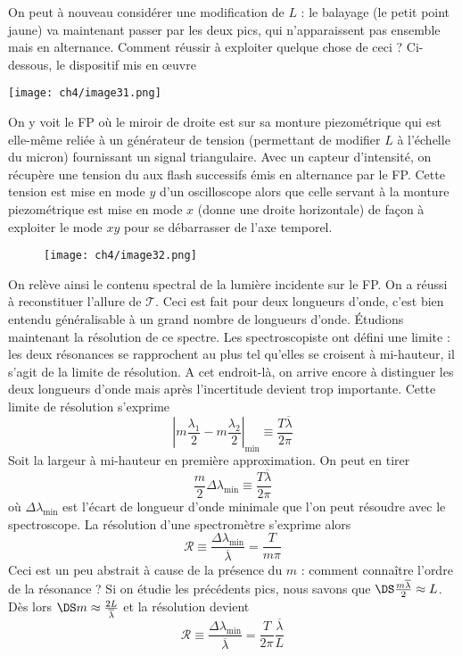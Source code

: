 On peut à nouveau considérer une modification de $L$ : le balayage (le petit point jaune) va maintenant 
passer par les deux pics, qui n'apparaissent pas ensemble mais en alternance. Comment réussir à exploiter 
quelque chose de ceci ? Ci-dessous, le dispositif mis en œuvre
\newpage
\begin{center}
	\texttt{[image: ch4/image31.png]}
\end{center}
On y voit le FP où le miroir de droite est sur sa monture piezométrique qui est elle-même reliée à 
un générateur de tension (permettant de modifier $L$ à l'échelle du micron) fournissant un signal 
triangulaire. Avec un capteur d'intensité, on récupère une tension du aux flash successifs émis en 
alternance par le FP. Cette tension est mise en mode $y$ d'un oscilloscope alors que celle servant 
à la monture piezométrique est mise en mode $x$ (donne une droite horizontale) de façon à exploiter 
le mode $xy$ pour se débarrasser de l'axe temporel.\\

	\begin{wrapfigure}[9]{r}{7.5cm}
	\vspace{-8mm}
	\texttt{[image: ch4/image32.png]}
	\end{wrapfigure}
On relève ainsi le contenu spectral de la lumière incidente sur le FP. On a réussi à reconstituer 
l'allure de $\mathcal{T}$. Ceci est fait pour deux longueurs d'onde, c'est bien entendu généralisable 
à un grand nombre de longueurs d'onde. Étudions maintenant la résolution de ce spectre. Les 
spectroscopiste ont défini une limite : les deux résonances se rapprochent au plus tel qu'elles se 
croisent à mi-hauteur, il s'agit de la limite de résolution. A cet endroit-là, on arrive encore à 
distinguer les deux longueurs d'onde mais après l'incertitude devient trop importante. Cette limite 
de résolution s'exprime
\begin{equation}
\left|m\dfrac{\lambda_1}{2}-m\dfrac{\lambda_2}{2}\right|_{\min} \equiv \dfrac{T\overline{\lambda}}{2\pi}
\end{equation}
Soit la largeur à mi-hauteur en première approximation. On peut en tirer
\begin{equation}
\dfrac{m}{2}\Delta\lambda_{\min} \equiv\dfrac{T\overline{\lambda}}{2\pi}
\end{equation}
où $\Delta\lambda_{\min}$ est l'écart de longueur d'onde minimale que l'on peut résoudre avec le 
spectroscope. La résolution d'une spectromètre s'exprime alors
\begin{equation}
\mathcal{R} \equiv\dfrac{\Delta\lambda_{\min}}{\overline{\lambda}} = \dfrac{T}{m\pi}
\end{equation}
Ceci est un peu abstrait à cause de la présence du $m$ : comment connaître l'ordre de la résonance ? 
Si on étudie les précédents pics, nous savons que $\DS\frac{m\overline{\lambda}}{2}\approx L$. Dès 
lors $\DS m\approx \frac{2L}{\overline{\lambda}}$ et la résolution devient
\begin{equation}
\mathcal{R} \equiv\dfrac{\Delta\lambda_{\min}}{\overline{\lambda}} =\dfrac{T}{2\pi}\dfrac{\overline{\lambda}}{L}
\end{equation}\ \\

